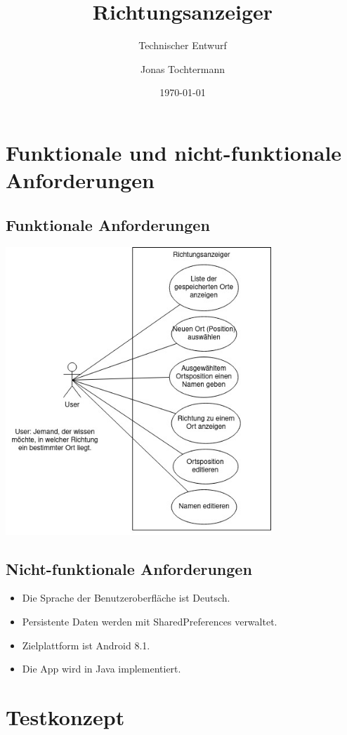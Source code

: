 \documentclass[12pt,a4paper]{scrartcl}
\title{Richtungsanzeiger}
\subtitle{Technischer Entwurf}
\author{Jonas Tochtermann}
\date{\today}
\begin{document}
\maketitle

\section{Funktionale und nicht-funktionale Anforderungen}

\subsection{Funktionale Anforderungen}

\includegraphics[width=10.0cm]{../UseCase.jpg}

\subsection{Nicht-funktionale Anforderungen}

\begin{itemize}
  \item Die Sprache der Benutzeroberfläche ist Deutsch.
  \item Persistente Daten werden mit SharedPreferences verwaltet.
  \item Zielplattform ist Android 8.1.
  \item Die App wird in Java implementiert.
\end{itemize}

\section{Testkonzept}
\end{document}
